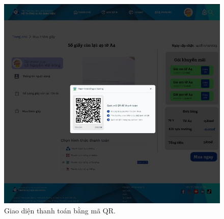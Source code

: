 \begin{figure}[H]
    \begin{center}
        \includegraphics[width=1\textwidth]{Images/Figma/zalopay.png}
        \caption{Giao diện thanh toán bằng mã QR.}
        \label{fig:arch}
    \end{center}
\end{figure}
